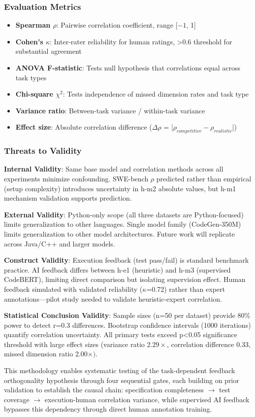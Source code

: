 \subsubsection{Evaluation Metrics}

\begin{itemize}
\item \textbf{Spearman $\rho$}: Pairwise correlation coefficient, range [$-1$, 1]
\item \textbf{Cohen's $\kappa$}: Inter-rater reliability for human ratings, >0.6 threshold for substantial agreement
\item \textbf{ANOVA F-statistic}: Tests null hypothesis that correlations equal across task types
\item \textbf{Chi-square $\chi^2$}: Tests independence of missed dimension rates and task type
\item \textbf{Variance ratio}: Between-task variance / within-task variance
\item \textbf{Effect size}: Absolute correlation difference ($\Delta\rho$ = |$\rho_{competitive} - \rho_{realistic}$|)
\end{itemize}

\subsubsection{Threats to Validity}

\textbf{Internal Validity}: Same base model and correlation methods across all experiments minimize confounding. SWE-bench $\rho$ predicted rather than empirical (setup complexity) introduces uncertainty in h-m2 absolute values, but h-m1 mechanism validation supports prediction.

\textbf{External Validity}: Python-only scope (all three datasets are Python-focused) limits generalization to other languages. Single model family (CodeGen-350M) limits generalization to other model architectures. Future work will replicate across Java/C++ and larger models.

\textbf{Construct Validity}: Execution feedback (test pass/fail) is standard benchmark practice. AI feedback differs between h-e1 (heuristic) and h-m3 (supervised CodeBERT), limiting direct comparison but isolating supervision effect. Human feedback simulated with validated reliability ($\kappa$=0.72) rather than expert annotations---pilot study needed to validate heuristic-expert correlation.

\textbf{Statistical Conclusion Validity}: Sample sizes (n=50 per dataset) provide 80\% power to detect r=0.3 differences. Bootstrap confidence intervals (1000 iterations) quantify correlation uncertainty. All primary tests exceed p<0.05 significance threshold with large effect sizes (variance ratio 2.$29\times$, correlation difference 0.33, missed dimension ratio 2.$00\times )$.

This methodology enables systematic testing of the task-dependent feedback orthogonality hypothesis through four sequential gates, each building on prior validation to establish the causal chain: specification completeness $\rightarrow$ test coverage $\rightarrow$ execution-human correlation variance, while supervised AI feedback bypasses this dependency through direct human annotation training.
